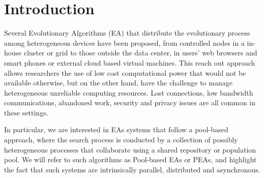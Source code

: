 \documentclass{llncs}
\begin{document}
\section{Introduction} %
Several Evolutionary Algorithms (EA) that distribute the evolutionary
process among heterogeneous devices have been proposed, from
controlled nodes in a in-house cluster or grid to those outside the
data center, in users’ web browsers and smart phones or external cloud
based virtual machines. This reach out approach allows researchers the
use of low cost computational power that would not be available
otherwise, but on the other hand, have the challenge to manage
heterogeneous unreliable computing resources. Lost connections, low
bandwidth communications, abandoned work, security and privacy issues
are all common in these settings. 



In particular, we are interested in EAs systems that follow a
pool-based approach, where the search process is conducted by a
collection of possibly heterogeneous processes that collaborate using
a shared repository or population pool. We will refer to such
algorithms as Pool-based EAs or PEAs, and highlight the fact that such
systems are intrinsically parallel, distributed and asynchronous. 
\end{document}
